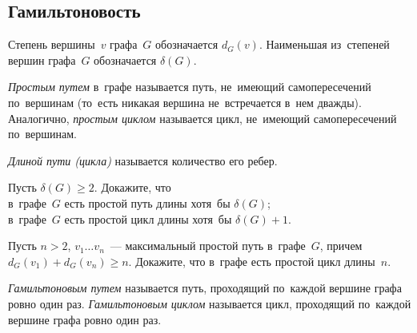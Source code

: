 


\subsection*{Гамильтоновость}

Степень вершины~$v$ графа~$G$ обозначается $d_{G}(v)$.
Наименьшая из~степеней вершин графа~$G$ обозначается $\delta(G)$.

\emph{Простым путем} в~графе называется путь, не~имеющий самопересечений
по~вершинам (то~есть никакая вершина не~встречается в~нем дважды).
Аналогично, \emph{простым циклом} называется цикл, не~имеющий самопересечений
по~вершинам.

\emph{Длиной пути (цикла)} называется количество его ребер.

\begin{problems}

\item
Пусть $\delta(G) \geq 2$.
Докажите, что
\\
\subproblem
в~графе~$G$ есть простой путь длины хотя~бы $\delta(G)$;
\\
\subproblem
в~графе~$G$ есть простой цикл длины хотя~бы $\delta(G) + 1$.

\item
Пусть $n > 2$, $v_{1} \ldots v_{n}$~--- максимальный простой путь в~графе~$G$,
причем \( d_{G}(v_{1}) + d_{G}(v_{n}) \geq n \).
Докажите, что в~графе есть простой цикл длины~$n$.

\end{problems}

\emph{Гамильтоновым путем} называется путь, проходящий по~каждой вершине графа
ровно один раз.
\emph{Гамильтоновым циклом} называется цикл, проходящий по~каждой вершине графа
ровно один раз.

